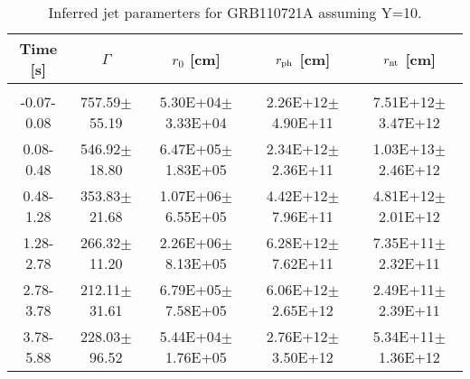 \begin{table}[htp]
\scriptsize
\label{tab:}
\begin{tabular}{c c c c c}
Time [s] & $\Gamma$ & $r_0$ [cm] & $r_{\rm ph}$ [cm] & $r_{\rm nt}$ [cm] \\
\hline \hline\\ 

-0.07-0.08 & 757.59$\pm$55.19 & 5.30E+04$\pm$3.33E+04 & 2.26E+12$\pm$4.90E+11 & 7.51E+12$\pm$3.47E+12 \\ 

0.08-0.48 & 546.92$\pm$18.80 & 6.47E+05$\pm$1.83E+05 & 2.34E+12$\pm$2.36E+11 & 1.03E+13$\pm$2.46E+12 \\ 

0.48-1.28 & 353.83$\pm$21.68 & 1.07E+06$\pm$6.55E+05 & 4.42E+12$\pm$7.96E+11 & 4.81E+12$\pm$2.01E+12 \\ 

1.28-2.78 & 266.32$\pm$11.20 & 2.26E+06$\pm$8.13E+05 & 6.28E+12$\pm$7.62E+11 & 7.35E+11$\pm$2.32E+11 \\ 

2.78-3.78 & 212.11$\pm$31.61 & 6.79E+05$\pm$7.58E+05 & 6.06E+12$\pm$2.65E+12 & 2.49E+11$\pm$2.39E+11 \\ 

3.78-5.88 & 228.03$\pm$96.52 & 5.44E+04$\pm$1.76E+05 & 2.76E+12$\pm$3.50E+12 & 5.34E+11$\pm$1.36E+12 \\ 

\end{tabular}
\caption{Inferred jet paramerters for GRB110721A assuming Y=10.}
\end{table}
